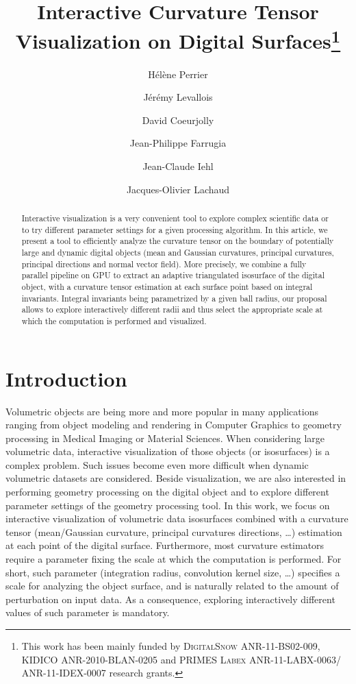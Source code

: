 \documentclass{llncs}
\title{Interactive Curvature Tensor Visualization on Digital
Surfaces\thanks{This work has been mainly funded by \textsc{DigitalSnow}
ANR-11-BS02-009, \textsc{KIDICO} ANR-2010-BLAN-0205 and \textsc{PRIMES Labex}
ANR-11-LABX-0063/ ANR-11-IDEX-0007 research grants.}}
\author{H\'el\`ene Perrier\inst{1}\and J\'er\'emy Levallois\inst{1,2}\and David
Coeurjolly\inst{1}\and Jean-Philippe Farrugia\inst{1}\and Jean-Claude
Iehl\inst{1}\and Jacques-Olivier Lachaud\inst{2} }
\institute{ Universit\'e de Lyon, CNRS\\
   LIRIS, UMR5205, F-69621, France
   \and
Universit\'e de Savoie Mont Blanc, CNRS\\
LAMA, UMR5127, F-73776, France\\
}
\begin{document}
\maketitle


\begin{abstract}\sloppy
  Interactive visualization is a very convenient tool to explore
  complex scientific data or to try different parameter settings
  for a given processing algorithm. In this article, we present a tool
  to efficiently analyze the curvature tensor on the boundary of
  potentially large and dynamic digital objects (mean and Gaussian curvatures,
  principal curvatures, principal directions and normal vector
  field). More precisely, we combine a fully parallel pipeline on GPU
  to extract an adaptive triangulated isosurface of the digital
  object, with a curvature tensor estimation at each surface point
  based on integral invariants. Integral invariants being parametrized
  by a given ball radius, our proposal allows to explore
  interactively different radii and thus select the appropriate scale
  at which the computation is performed and visualized.

\end{abstract}

\section{Introduction}
\label{sec:introduction}

Volumetric objects are being more and more popular in many
applications ranging from object modeling and rendering in Computer
Graphics to geometry processing in Medical Imaging or Material
Sciences. When considering large volumetric data, interactive
visualization of those objects (or isosurfaces) is a complex
problem. Such issues become even more difficult when dynamic
volumetric datasets are considered. Beside
visualization, we are also interested in performing geometry
processing on the digital object and to explore different parameter
settings of the geometry processing tool.  In this work, we focus on
interactive visualization of volumetric data isosurfaces combined with
a curvature tensor (mean/Gaussian curvature, principal curvatures
directions, \ldots) estimation at each point of the digital
surface.
Furthermore,
most curvature estimators require a parameter fixing the scale
at which the computation is performed. For short, such parameter
(integration radius, convolution kernel size, \ldots) specifies a scale for analyzing the object surface, and is naturally related to the amount of perturbation on input data. As a consequence, exploring interactively
different values of such parameter is mandatory.
\vspace{0.2cm}
\end{document}
